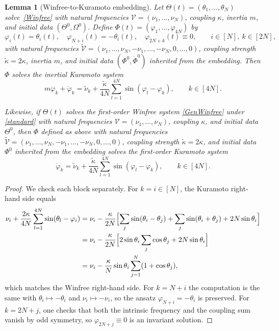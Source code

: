 \documentclass[11pt,reqno]{amsart}
\newtheorem{lemma}{Lemma}[section]
\theoremstyle{definition}
\theoremstyle{remark}
\begin{document}
\begin{lemma}[Winfree-to-Kuramoto embedding]\label{lem:embedding}
Let $\Theta(t)=(\theta_1,\dots,\theta_N)$ solve~\eqref{Winfree}
with natural frequencies $\mathcal V=(\nu_1,\dots,\nu_N)$, coupling
$\kappa$, inertia $m$, and initial data $(\Theta^0,\Omega^0)$. Define
$\Phi(t)=(\varphi_1,\dots,\varphi_{4N})$ by
\[
\varphi_i(t)=\theta_i(t),\quad \varphi_{N+i}(t)=-\theta_i(t),\quad
\varphi_{2N+k}(t)\equiv 0,\qquad i\in[N],\ k\in[2N],
\]
with natural frequencies
$\widetilde{\mathcal V}=(\nu_1,\dots,\nu_N,-\nu_1,\dots,-\nu_N,0,\dots,0)$,
coupling strength $\tilde\kappa=2\kappa$, inertia $m$, and initial
data $(\Phi^0,\dot\Phi^0)$ inherited from the embedding. Then $\Phi$
solves the inertial Kuramoto system
\begin{equation}\label{eq:Kur-embed}
m\ddot\varphi_k+\dot\varphi_k=\tilde\nu_k+\frac{\tilde\kappa}{4N}\sum_{l=1}^{4N}\sin(\varphi_l-\varphi_k),\qquad k\in[4N].
\end{equation}

Likewise, if $\Theta(t)$ solves the first-order Winfree system \eqref{GenWinfree} under \eqref{standard} with natural frequencies $\mathcal V=(\nu_1,\dots,\nu_N)$, coupling
$\kappa$, and initial data $\Theta^0$, then $\Phi$ defined as above with natural frequencies
$\widetilde{\mathcal V}=(\nu_1,\dots,\nu_N,-\nu_1,\dots,-\nu_N,0,\dots,0)$,
coupling strength $\tilde\kappa=2\kappa$, and initial
data $\Phi^0$ inherited from the embedding solves the first-order Kuramoto system
\begin{equation}\label{eq:Kur-first}
\dot\varphi_k=\tilde\nu_k+\frac{\tilde\kappa}{4N}\sum_{l=1}^{4N}\sin(\varphi_l-\varphi_k),\qquad k\in[4N].
\end{equation}
\end{lemma}
\begin{proof}
We check each block separately. For $k=i\in[N]$, the Kuramoto right-hand
side equals
\begin{align*}
\nu_i+\frac{2\kappa}{4N}\sum_{l=1}^{4N}\sin(\theta_l-\varphi_i)
&=\nu_i-\frac{\kappa}{2N}\Bigl[\sum_j\sin(\theta_i-\theta_j)+\sum_j\sin(\theta_i+\theta_j)+2N\sin\theta_i\Bigr]\\
&=\nu_i-\frac{\kappa}{2N}\Bigl[2\sin\theta_i\sum_j\cos\theta_j+2N\sin\theta_i\Bigr]\\
&=\nu_i-\frac{\kappa}{N}\sin\theta_i\sum_{j=1}^N(1+\cos\theta_j),
\end{align*}
which matches the Winfree right-hand side. For
$k=N+i$ the computation is the same with $\theta_i\mapsto-\theta_i$
and $\nu_i\mapsto-\nu_i$, so the ansatz $\varphi_{N+i}=-\theta_i$ is
preserved. For $k=2N+j$, one checks that both the intrinsic frequency
and the coupling sum vanish by odd symmetry, so
$\varphi_{2N+j}\equiv 0$ is an invariant solution.
\end{proof}
\end{document}
